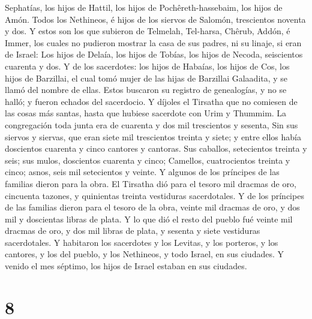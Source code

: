 Sephatías, los hijos de Hattil, los hijos de Pochêreth-hassebaim, los
hijos de Amón.  Todos los Nethineos, é hijos de los siervos
de Salomón, trescientos noventa y dos.  Y estos son los que
subieron de Telmelah, Tel-harsa, Chêrub, Addón, é Immer, los cuales no
pudieron mostrar la casa de sus padres, ni su linaje, si eran de Israel:
 Los hijos de Delaía, los hijos de Tobías, los hijos de
Necoda, seiscientos cuarenta y dos.  Y de los sacerdotes:
los hijos de Habaías, los hijos de Cos, los hijos de Barzillai, el cual
tomó mujer de las hijas de Barzillai Galaadita, y se llamó del nombre de
ellas.  Estos buscaron su registro de genealogías, y no se
halló; y fueron echados del sacerdocio.  Y díjoles el
Tirsatha que no comiesen de las cosas más santas, hasta que hubiese
sacerdote con Urim y Thummim.  La congregación toda junta
era de cuarenta y dos mil trescientos y sesenta,  Sin sus
siervos y siervas, que eran siete mil trescientos treinta y siete; y
entre ellos había doscientos cuarenta y cinco cantores y cantoras.
 Sus caballos, setecientos treinta y seis; sus mulos,
doscientos cuarenta y cinco;  Camellos, cuatrocientos
treinta y cinco; asnos, seis mil setecientos y veinte.  Y
algunos de los príncipes de las familias dieron para la obra. El
Tirsatha dió para el tesoro mil dracmas de oro, cincuenta tazones, y
quinientas treinta vestiduras sacerdotales.  Y de los
príncipes de las familias dieron para el tesoro de la obra, veinte mil
dracmas de oro, y dos mil y doscientas libras de plata.  Y
lo que dió el resto del pueblo fué veinte mil dracmas de oro, y dos mil
libras de plata, y sesenta y siete vestiduras sacerdotales.
 Y habitaron los sacerdotes y los Levitas, y los porteros,
y los cantores, y los del pueblo, y los Nethineos, y todo Israel, en sus
ciudades. Y venido el mes séptimo, los hijos de Israel estaban en sus
ciudades.

\hypertarget{section-7}{%
\section{8}\label{section-7}}

